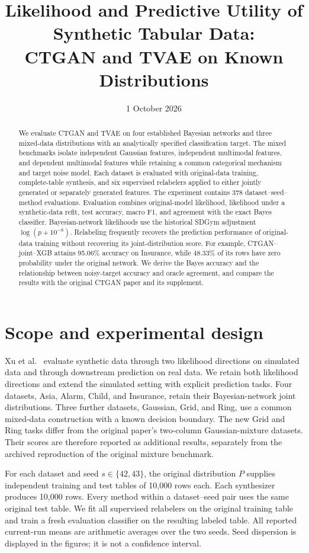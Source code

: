\documentclass[11pt,letterpaper]{article}
\title{Likelihood and Predictive Utility of Synthetic Tabular Data:\\CTGAN and TVAE on Known Distributions}
\author{}
\date{1 October 2026}
\begin{document}
\maketitle
\begin{abstract}
We evaluate CTGAN and TVAE on four established Bayesian networks and three mixed-data distributions with an analytically specified classification target. The mixed benchmarks isolate independent Gaussian features, independent multimodal features, and dependent multimodal features while retaining a common categorical mechanism and target noise model. Each dataset is evaluated with original-data training, complete-table synthesis, and six supervised relabelers applied to either jointly generated or separately generated features. The experiment contains 378 dataset--seed--method evaluations. Evaluation combines original-model likelihood, likelihood under a synthetic-data refit, test accuracy, macro F1, and agreement with the exact Bayes classifier. Bayesian-network likelihoods use the historical SDGym adjustment $\log(p+10^{-8})$. Relabeling frequently recovers the prediction performance of original-data training without recovering its joint-distribution score. For example, CTGAN--joint--XGB attains 95.06\% accuracy on Insurance, while 48.33\% of its rows have zero probability under the original network. We derive the Bayes accuracy and the relationship between noisy-target accuracy and oracle agreement, and compare the results with the original CTGAN paper and its supplement.
\end{abstract}

\section{Scope and experimental design}
Xu et al.~\cite{xu2019} evaluate synthetic data through two likelihood directions on simulated data and through downstream prediction on real data. We retain both likelihood directions and extend the simulated setting with explicit prediction tasks. Four datasets, Asia, Alarm, Child, and Insurance, retain their Bayesian-network joint distributions. Three further datasets, Gaussian, Grid, and Ring, use a common mixed-data construction with a known decision boundary. The new Grid and Ring tasks differ from the original paper's two-column Gaussian-mixture datasets. Their scores are therefore reported as additional results, separately from the archived reproduction of the original mixture benchmark.

For each dataset and seed $s\in\{42,43\}$, the original distribution $P$ supplies independent training and test tables of 10,000 rows each. Each synthesizer produces 10,000 rows. Every method within a dataset--seed pair uses the same original test table. We fit all supervised relabelers on the original training table and train a fresh evaluation classifier on the resulting labeled table. All reported current-run means are arithmetic averages over the two seeds. Seed dispersion is displayed in the figures; it is not a confidence interval.
\end{document}
